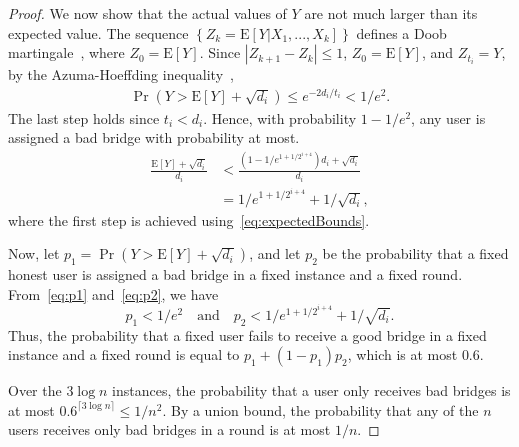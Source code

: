 \documentclass{llncs}
\newcommand{\E}{\mathbf{\mathrm{E}}}
\begin{document}
\begin{proof}
	We now show that the actual values of $Y$ are not much larger than its expected value.
	The sequence ${\left\{Z_k = \E[Y|X_1,...,X_k]\right\}}$ defines a Doob martingale~\cite[Chapter~5]{dubhashi:2009}, where ${Z_0 = \E[Y]}$.  Since ${|Z_{k+1} - Z_k| \leq 1}$, ${Z_0 = \E[Y]}$, and ${Z_{t_i} = Y}$, by the Azuma-Hoeffding inequality~\cite[Theorem 5.2]{dubhashi:2009},
	\begin{align}
	\Pr(Y > \E[Y] + \sqrt{d_i}) \leq e^{-2d_i/t_i} < 1/e^2. \label{eq:p1}
	\end{align}
	The last step holds since ${t_i < d_i}$. Hence, with probability $1-1/e^2$, any user is assigned a bad bridge with probability at most.
	\begin{align}
	\frac{\E[Y] + \sqrt{d_i}}{d_i} &< \frac{(1-1/e^{1+1/2^{i+4}})d_i + \sqrt{d_i}}{d_i} \nonumber \\ &= 1/e^{1+1/2^{i+4}} + 1/\sqrt{d_i}, \label{eq:p2}
	\end{align}
	where the first step is achieved using~\eqref{eq:expectedBounds}.
	
	Now, let ${p_1 = \Pr(Y > \E[Y] + \sqrt{d_i})}$, and let $p_2$ be the probability that a fixed honest user is assigned a bad bridge in a fixed instance and a fixed round. From~\eqref{eq:p1} and~\eqref{eq:p2}, we have
	\[p_1 < 1/e^2 \quad \text{and} \quad p_2 < 1/e^{1+1/2^{i+4}} + 1/\sqrt{d_i}.\]
	Thus, the probability that a fixed user fails to receive a good bridge in a fixed instance and a fixed round is equal to ${p_1 + (1-p_1)p_2}$, which is at most $0.6$.
	
	Over the $3 \log{n}$ instances, the probability that a user only receives bad bridges is at most ${0.6^{\lceil 3\log{n} \rceil} \leq 1/n^2}$.
	By a union bound, the probability that any of the $n$ users receives only bad bridges in a round is at most $1/n$. 
\end{proof}

\end{document}
